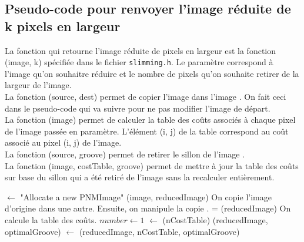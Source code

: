 \documentclass[a4paper, 11pt, oneside]{article}
\begin{document}
\subsection{Pseudo-code pour renvoyer l'image réduite de k pixels en largeur}
La fonction qui retourne l'image réduite de  pixels en largeur est la fonction (image, k) spécifiée dans le fichier \texttt{slimming.h}. Le paramètre  correspond à l'image qu'on souhaitre réduire et  le nombre de pixels qu'on souhaite retirer de la largeur de l'image.\\
La fonction (source, dest) permet de copier l'image  dans l'image . On fait ceci dans le pseudo-code qui va suivre pour ne pas modifier l'image de départ.\\
La fonction (image) permet de calculer la table des coûts associés à chaque pixel de l'image passée en paramètre. L'élément (i, j) de la table correspond au coût associé au pixel (i, j) de l'image.\\
La fonction (source, groove) permet de retirer le sillon  de l'image .\\
La fonction (image, costTable, groove) permet de mettre à jour la table des coûts  sur base du sillon  qui a été retiré de l'image sans la recalculer entièrement.

\begin{codebox} %
        \li {} $\gets$ "Allocate a new PNMImage"
        \li {}(image, reducedImage)
        \li \hspace{0.4cm}\Comment On copie l'image d'origine dans une autre. Ensuite, on manipule la copie .
        \li {} = (reducedImage) \Comment On calcule la table des coûts.
        \li
	    \li \For $number \gets 1$ \To {}
                \Do
         \li    	{} $\gets$ (nCostTable)
         \li		{}(reducedImage, optimalGroove)
         \li		{} $\gets$ (reducedImage, nCostTable, optimalGroove)
                \End
        \li
        \li \Return {}
\end{codebox}
\end{document}
